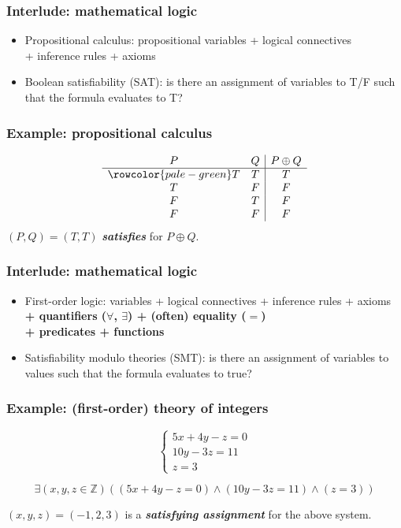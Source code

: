 \documentclass[11pt,table]{beamer}
\begin{document}
\begin{frame}
  \frametitle{Interlude: mathematical logic}
  \begin{itemize}
  \item{Propositional calculus: propositional variables + logical connectives \\
    + inference rules + axioms}
    \medskip
  \item{Boolean satisfiability (SAT): is there an assignment of variables to T/F such that the formula evaluates to T?}
  \end{itemize}
\end{frame}

\begin{frame}
  \frametitle{Example: propositional calculus}
  \begin{displaymath}
    \begin{array}{c c | c}
      P & Q & P \oplus Q\\
      \hline
      \rowcolor{pale-green} T & T & T\\
      T & F & F\\
      F & T & F\\
      F & F & F\\
      \end{array}
  \end{displaymath}
  \bigskip
  \center $(P, Q) = (T, T)$ \textbf{\textit{satisfies}} for $P \oplus Q$.
  
\end{frame}

\begin{frame}
  \frametitle{Interlude: mathematical logic}
  \begin{itemize}
  \item{First-order logic: variables + logical connectives 
    + inference rules + axioms \textbf{+ quantifiers ($\forall$, $\exists$) 
      + (often) equality ($=$) \\ 
      + predicates + functions} }
    \medskip
  \item{Satisfiability modulo theories (SMT): is there an assignment of variables to values such that the formula evaluates to true?}
  \end{itemize}
\end{frame}

\begin{frame}
  \frametitle{Example: (first-order) theory of integers}
  \begin{displaymath}
    \begin{cases}
      5x + 4y - z = 0 \\
      10y - 3z = 11 \\
      z = 3
    \end{cases}
  \end{displaymath}
  
  \center\[ \exists (x, y, z \in \mathbb{Z})(
  (5x + 4y -z = 0) \wedge
  (10y - 3z = 11) \wedge
  (z = 3))
  \]
  
\center $(x, y, z) = (-1, 2, 3)$ is a \textbf{\textit{satisfying assignment}} for the above system.
\end{frame}
\end{document}
